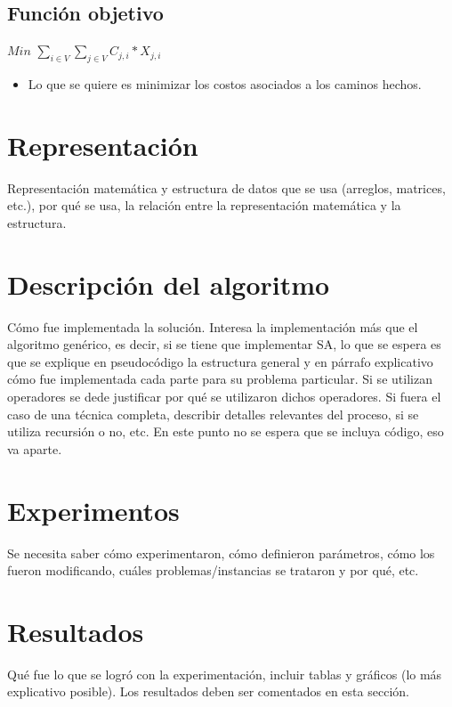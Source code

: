 \documentclass[letter, 10pt]{article}
\begin{document}
\subsection{Funci\'on objetivo}

\begin{center}
$Min$ $\displaystyle\sum_{i \in V}\sum_{j \in V} C_{j,i}*X_{j,i}$
\end{center}
\begin{itemize}
 \item Lo que se quiere es minimizar los costos asociados a los caminos hechos.
\end{itemize}

\section{Representaci\'on}
Representaci\'on matem\'atica y estructura de datos que se usa (arreglos, matrices, etc.),
por qu\'e se usa, la relaci\'on entre la representaci\'on matem\'atica y la estructura.

\section{Descripci\'on del algoritmo}
C\'omo fue implementada la soluci\'on. Interesa la implementaci\'on m\'as que el algoritmo gen\'erico, es decir,
si se tiene que implementar SA, lo que se espera es que se explique en pseudoc\'odigo la estructura
general y en p\'arrafo explicativo c\'omo fue implementada cada parte para su problema particular. Si
se utilizan operadores se dede justificar por qu\'e se utilizaron dichos operadores. Si fuera el caso de una
t\'ecnica completa, describir detalles relevantes del proceso, si se utiliza recursi\'on o no, etc.
En este punto no se espera que se incluya c\'odigo, eso va aparte.

\section{Experimentos}
Se necesita saber c\'omo experimentaron, c\'omo definieron par\'ametros, c\'omo los fueron modificando, cu\'ales 
problemas/instancias se trataron y por qu\'e, etc.

\section{Resultados}
Qu\'e fue lo que se logr\'o con la experimentaci\'on, incluir tablas y gr\'aficos (lo m\'as explicativo posible).
Los resultados deben ser comentados en esta secci\'on.
\end{document}
